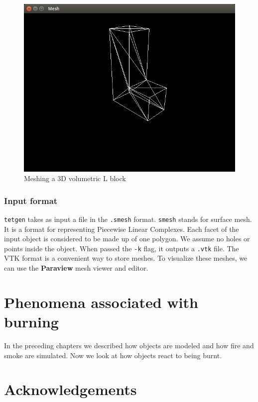 \documentclass[a4paper]{report}
\begin{document}
\begin{figure}[H]
\centering
\includegraphics[width=\linewidth]{lmesh}
\caption{Meshing a 3D volumetric L block}
\label{fig:lmesh}
\end{figure}

\subsection{Input format}

\texttt{tetgen} takes as input a file in the \texttt{.smesh} format. \texttt{smesh} stands for surface mesh. It is a format for representing Piecewise Linear Complexes. Each facet of the input object is considered to be made up of one polygon. We assume no holes or points inside the object. When passed the \texttt{-k} flag, it outputs a \texttt{.vtk} file. The VTK format is a convenient way to store meshes. To visualize these meshes, we can use the \textbf{Paraview} mesh viewer and editor.

\chapter{Phenomena associated with burning}

In the preceding chapters we described how objects are modeled and how fire and smoke are simulated. Now we look at how objects react to being burnt.

\chapter{Acknowledgements}
\end{document}
